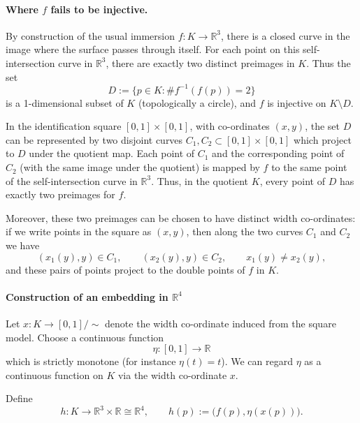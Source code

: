 \documentclass[12pt,a4paper]{article}
\theoremstyle{plain}
\theoremstyle{definition}      %
\begin{document}
\paragraph{Where $f$ fails to be injective.}
By construction of the usual immersion $f : K \to \mathbb{R}^3$, there is a
closed curve in the image where the surface passes through itself.  For each
point on this self-intersection curve in $\mathbb{R}^3$, there are exactly two
distinct preimages in $K$.  Thus the set
\[
D := \{ p \in K : \# f^{-1}(f(p)) = 2 \}
\]
is a 1-dimensional subset of $K$ (topologically a circle), and $f$ is injective
on $K \setminus D$.

In the identification square $[0,1]\times[0,1]$, with co-ordinates $(x,y)$,
the set $D$ can be represented by two disjoint curves
$C_1, C_2 \subset [0,1]\times[0,1]$ which project to $D$ under the quotient
map.  Each point of $C_1$ and the corresponding point of $C_2$ (with the same
image under the quotient) is mapped by $f$ to the same point of the
self-intersection curve in $\mathbb{R}^3$.  Thus, in the quotient $K$, every
point of $D$ has exactly two preimages for $f$.

Moreover, these two preimages can be chosen to have distinct width co-ordinates:
if we write points in the square as $(x,y)$, then along the two curves
$C_1$ and $C_2$ we have
\[
(x_1(y),y) \in C_1, \qquad (x_2(y),y) \in C_2, \qquad x_1(y) \neq x_2(y),
\]
and these pairs of points project to the double points of $f$ in $K$.

\paragraph{Construction of an embedding in $\mathbb{R}^{4}$}

Let $x : K \to [0,1]/\!\sim$ denote the width co-ordinate induced from the square
model.  Choose a continuous function
\[
\eta : [0,1] \longrightarrow \mathbb{R}
\]
which is strictly monotone (for instance $\eta(t) = t$).  We can regard
$\eta$ as a continuous function on $K$ via the width co-ordinate $x$.

Define
\[
h : K \longrightarrow \mathbb{R}^3 \times \mathbb{R} \cong \mathbb{R}^4,
\qquad
h(p) := \bigl(f(p), \eta(x(p))\bigr).
\]
\end{document}
